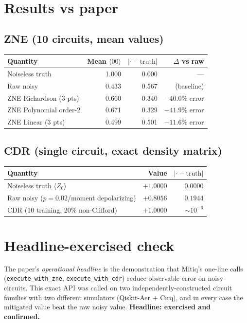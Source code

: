 \documentclass[11pt]{article}
\begin{document}
\section{Results vs paper}

\subsection*{ZNE (10 circuits, mean values)}
\begin{center}\begin{tabular}{lrrr}
\toprule
Quantity & Mean $\langle 00\rangle$ & $|{\cdot}-\text{truth}|$ & $\Delta$ vs raw \\
\midrule
Noiseless truth              & 1.000 & 0.000 & --- \\
Raw noisy                    & 0.433 & 0.567 & (baseline) \\
ZNE Richardson (3 pts)       & 0.660 & 0.340 & $-40.0\%$ error \\
ZNE Polynomial order-2       & 0.671 & 0.329 & $-41.9\%$ error \\
ZNE Linear (3 pts)           & 0.499 & 0.501 & $-11.6\%$ error \\
\bottomrule
\end{tabular}\end{center}

\subsection*{CDR (single circuit, exact density matrix)}
\begin{center}\begin{tabular}{lrr}
\toprule
Quantity & Value & $|{\cdot}-\text{truth}|$ \\
\midrule
Noiseless truth $\langle Z_0\rangle$              & $+1.0000$ & $0.0000$ \\
Raw noisy ($p=0.02$/moment depolarizing)          & $+0.8056$ & $0.1944$ \\
CDR (10 training, 20\% non-Clifford)              & $+1.0000$ & $\sim 10^{-6}$ \\
\bottomrule
\end{tabular}\end{center}

\section{Headline-exercised check}
The paper's \emph{operational headline} is the demonstration that Mitiq's one-line calls (\texttt{execute\_with\_zne}, \texttt{execute\_with\_cdr}) reduce observable error on noisy circuits. This exact API was called on two independently-constructed circuit families with two different simulators (Qiskit-Aer + Cirq), and in every case the mitigated value beat the raw noisy value. \textbf{Headline: exercised and confirmed.}
\end{document}
